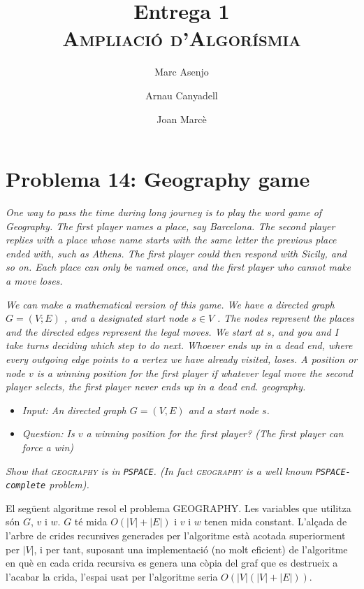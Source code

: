 \documentclass[a4paper]{article}
\title{Entrega 1 \\ \textsc{Ampliació d'Algorísmia}}
\author{Marc Asenjo \and Arnau Canyadell \and Joan Marcè}
\date{}
\begin{document}
\maketitle

\section{Problema 14: Geography game}


\emph{One way to pass the time during long journey is to play the word game
of Geography. The first player names a place, say Barcelona. The second player replies
with a place whose name starts with the same letter the previous place ended with, such as
Athens. The first player could then respond with Sicily, and so on. Each place can only be
named once, and the first player who cannot make a move loses.}

\emph{We can make a mathematical version of this game. We have a directed graph $G = (V;E)$ ,
and a designated start node $s \in V$ . The nodes represent the places and the directed edges
represent the legal moves. We start at $s$, and you and I take turns deciding which step to
do next. Whoever ends up in a dead end, where every outgoing edge points to a vertex we
have already visited, loses. A position or node $v$ is a winning position for the first player if
whatever legal move the second player selects, the first player never ends up in a dead end.
geography.}

\begin{itemize}
	\item \emph{Input: An directed graph $G = (V, E)$ and a start node $s$.}
	\item \emph{Question: Is $v$ a winning position for the first player? (The first player can force a win)}
\end{itemize}

\emph{Show that \textsc{geography} is in \texttt{PSPACE}. (In fact \textsc{geography} is a well known \texttt{PSPACE-complete}
problem).}

El següent algoritme resol el problema GEOGRAPHY. Les variables que utilitza són $G$, $v$ i $w$. $G$ té mida $O(|V|+|E|)$ i $v$ i $w$ tenen mida constant. L'alçada de l'arbre de crides recursives generades per l'algoritme està acotada superiorment per $|V|$, i per tant, suposant una implementació (no molt eficient) de l'algoritme en què en cada crida recursiva es genera una còpia del graf que es destrueix a l'acabar la crida, l'espai usat per l'algoritme seria $O(|V|(|V|+|E|))$.
\end{document}
